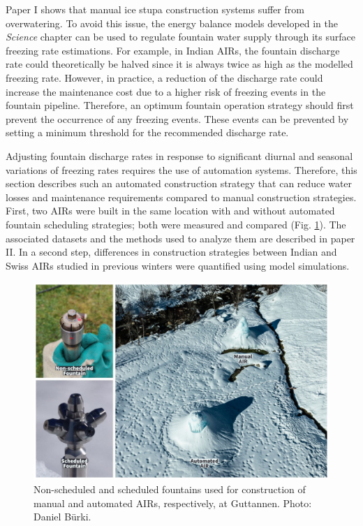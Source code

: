 Paper I shows that manual ice stupa construction systems suffer from overwatering. To avoid this issue, the
energy balance models developed in the \textit{Science} chapter can be used to regulate fountain water supply
through its surface freezing rate estimations. For example, in Indian \ac{AIRs}, the fountain discharge rate could
theoretically be halved since it is always twice as high as the modelled freezing rate. However, in practice, a
reduction of the discharge rate could increase the maintenance cost due to a higher risk of freezing events in
the fountain pipeline. Therefore, an optimum fountain operation strategy should first prevent the occurrence of
any freezing events. These events can be prevented by setting a minimum threshold for the recommended discharge
rate.

Adjusting fountain discharge rates in response to significant diurnal and seasonal variations of freezing rates
requires the use of automation systems. Therefore, this section describes such an automated construction
strategy that can reduce water losses and maintenance requirements compared to manual construction strategies.
First, two \ac{AIRs} were built in the same location with and without automated fountain scheduling strategies; both
were measured and compared (Fig. \ref{fig:autovsman}). The associated datasets and the methods used to analyze
them are described in paper II. In a second step, differences in construction strategies between Indian and
Swiss \ac{AIRs} studied in previous winters were quantified using model simulations. 

\begin{figure}[htb]
	\includegraphics[width=\textwidth]{figs/AIR_fountains.jpg}
	\caption{Non-scheduled and scheduled fountains used for construction of manual and automated \ac{AIRs}, respectively, at
		Guttannen. Photo: Daniel Bürki.}
	\label{fig:autovsman}
\end{figure}

